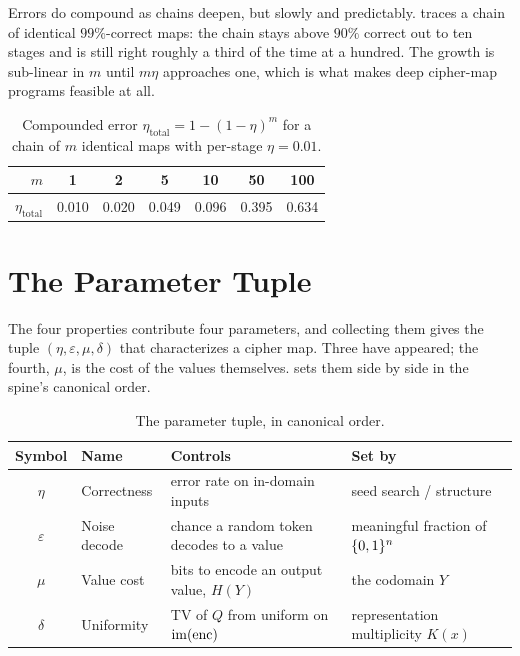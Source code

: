 Errors do compound as chains deepen, but slowly and predictably.
 traces a chain of identical $99\%$-correct maps:
the chain stays above $90\%$ correct out to ten stages and is still right
roughly a third of the time at a hundred. The growth is sub-linear in $m$
until $m\eta$ approaches one, which is what makes deep cipher-map programs
feasible at all.

\begin{table}[t]
\centering
\caption{Compounded error $\eta_{\mathrm{total}} = 1 - (1-\eta)^m$ for a
chain of $m$ identical maps with per-stage $\eta = 0.01$.}
\label{tab:compounding}
\begin{tabular}{@{}rcccccc@{}}
\toprule
$m$ & 1 & 2 & 5 & 10 & 50 & 100 \\
\midrule
$\eta_{\mathrm{total}}$ & 0.010 & 0.020 & 0.049 & 0.096 & 0.395 & 0.634 \\
\bottomrule
\end{tabular}
\end{table}

\section{The Parameter Tuple}
\label{sec:parameter-tuple}

The four properties contribute four parameters, and collecting them gives
the tuple $(\eta, \varepsilon, \mu, \delta)$ that characterizes a cipher map.
Three have appeared; the fourth, $\mu$, is the cost of the values
themselves.  sets them side by side in the spine's
canonical order.

\begin{table}[t]
\centering
\caption{The parameter tuple, in canonical order.}
\label{tab:parameters}
\begin{tabular}{@{}clll@{}}
\toprule
Symbol & Name & Controls & Set by \\
\midrule
$\eta$ & Correctness & error rate on in-domain inputs & seed search / structure \\
$\varepsilon$ & Noise decode & chance a random token decodes to a value & meaningful fraction of $\{0,1\}^n$ \\
$\mu$ & Value cost & bits to encode an output value, $H(Y)$ & the codomain $Y$ \\
$\delta$ & Uniformity & TV of $Q$ from uniform on $\mathrm{im}(\operatorname{enc})$ & representation multiplicity $K(x)$ \\
\bottomrule
\end{tabular}
\end{table}


